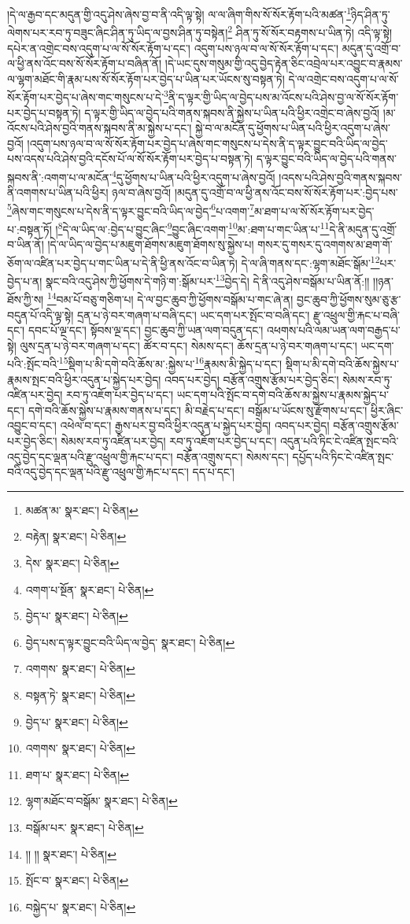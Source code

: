 །དེ་ལ་རྒྱབ་དང་མདུན་གྱི་འདུ་ཤེས་ཞེས་བྱ་བ་ནི་འདི་ལྟ་སྟེ། ལ་ལ་ཞིག་གིས་སོ་སོར་རྟོག་པའི་མཚན་\footnote{མཚན་མ་  སྣར་ཐང་།  པེ་ཅིན། }ཉིད་ཤིན་ཏུ་ལེགས་པར་རབ་ཏུ་བཟུང་ཞིང་ཤིན་ཏུ་ཡིད་ལ་བྱས་ཤིན་ཏུ་བསྟེན།\footnote{བརྟེན།  སྣར་ཐང་།  པེ་ཅིན། } ཤིན་ཏུ་སོ་སོར་བརྟགས་པ་ཡིན་ཏེ། འདི་ལྟ་སྟེ། དཔེར་ན་འགྲེང་བས་འདུག་པ་ལ་སོ་སོར་རྟོག་པ་དང་། འདུག་པས་ཉལ་བ་ལ་སོ་སོར་རྟོག་པ་དང་། མདུན་དུ་འགྲོ་བ་ལ་ཕྱི་ནས་འོང་བས་སོ་སོར་རྟོག་པ་བཞིན་ནོ། །དེ་ཡང་དུས་གསུམ་གྱི་འདུ་བྱེད་རྟེན་ཅིང་འབྲེལ་པར་འབྱུང་བ་རྣམས་ལ་ལྷག་མཐོང་གི་རྣམ་པས་སོ་སོར་རྟོག་པར་བྱེད་པ་ཡིན་པར་ཡོངས་སུ་བསྟན་ཏེ། དེ་ལ་འགྲེང་བས་འདུག་པ་ལ་སོ་སོར་རྟོག་པར་བྱེད་པ་ཞེས་གང་གསུངས་པ་དེ་\footnote{དེས་  སྣར་ཐང་།  པེ་ཅིན། }ནི་ད་ལྟར་གྱི་ཡིད་ལ་བྱེད་པས་མ་འོངས་པའི་ཤེས་བྱ་ལ་སོ་སོར་རྟོག་པར་བྱེད་པ་བསྟན་ཏེ། ད་ལྟར་གྱི་ཡིད་ལ་བྱེད་པའི་གནས་སྐབས་ནི་སྐྱེས་པ་ཡིན་པའི་ཕྱིར་འགྲེང་བ་ཞེས་བྱའོ། །མ་འོངས་པའི་ཤེས་བྱའི་གནས་སྐབས་ནི་མ་སྐྱེས་པ་དང་། སྐྱེ་བ་ལ་མངོན་དུ་ཕྱོགས་པ་ཡིན་པའི་ཕྱིར་འདུག་པ་ཞེས་བྱའོ། །འདུག་པས་ཉལ་བ་ལ་སོ་སོར་རྟོག་པར་བྱེད་པ་ཞེས་གང་གསུངས་པ་དེས་ནི་ད་ལྟར་བྱུང་བའི་ཡིད་ལ་བྱེད་པས་འདས་པའི་ཤེས་བྱའི་དངོས་པོ་ལ་སོ་སོར་རྟོག་པར་བྱེད་པ་བསྟན་ཏེ། ད་ལྟར་བྱུང་བའི་ཡིད་ལ་བྱེད་པའི་གནས་སྐབས་ནི་:འགག་པ་ལ་མངོན་\footnote{འགག་པ་སྔོན་  སྣར་ཐང་།  པེ་ཅིན། }དུ་ཕྱོགས་པ་ཡིན་པའི་ཕྱིར་འདུག་པ་ཞེས་བྱའོ། །འདས་པའི་ཤེས་བྱའི་གནས་སྐབས་ནི་འགགས་པ་ཡིན་པའི་ཕྱིར། ཉལ་བ་ཞེས་བྱའོ། །མདུན་དུ་འགྲོ་བ་ལ་ཕྱི་ནས་འོང་བས་སོ་སོར་རྟོག་པར་:བྱེད་པས་\footnote{བྱེད་པ་  སྣར་ཐང་།  པེ་ཅིན། }ཞེས་གང་གསུངས་པ་དེས་ནི་ད་ལྟར་བྱུང་བའི་ཡིད་ལ་བྱེད་\footnote{བྱེད་པས་ད་ལྟར་བྱུང་བའི་ཡིད་ལ་བྱེད་  སྣར་ཐང་།  པེ་ཅིན། }པ་འགག་\footnote{འགགས་  སྣར་ཐང་།  པེ་ཅིན། }མ་ཐག་པ་ལ་སོ་སོར་རྟོག་པར་བྱེད་པ་:བསྟན་ཏོ། །\footnote{བསྟན་ཏེ་  སྣར་ཐང་།  པེ་ཅིན། }དེ་ལ་ཡིད་ལ་:བྱེད་པ་བྱུང་ཞིང་\footnote{བྱེད་པ་  སྣར་ཐང་།  པེ་ཅིན། }བྱུང་ཞིང་འགག་\footnote{འགགས་  སྣར་ཐང་།  པེ་ཅིན། }མ་:ཐག་པ་གང་ཡིན་པ་\footnote{ཐག་པ་  སྣར་ཐང་།  པེ་ཅིན། }དེ་ནི་མདུན་དུ་འགྲོ་བ་ཡིན་ནོ། །དེ་ལ་ཡིད་ལ་བྱེད་པ་མཇུག་ཐོགས་མཇུག་ཐོགས་སུ་སྐྱེས་པ། གསར་དུ་གསར་དུ་འགགས་མ་ཐག་གོ་ཅོག་ལ་འཛིན་པར་བྱེད་པ་གང་ཡིན་པ་དེ་ནི་ཕྱི་ནས་འོང་བ་ཡིན་ཏེ། དེ་ལ་ཞི་གནས་དང་:ལྷག་མཐོང་སྒོམ་\footnote{ལྷག་མཐོང་བ་བསྒོམ་  སྣར་ཐང་།  པེ་ཅིན། }པར་བྱེད་པ་ན། སྣང་བའི་འདུ་ཤེས་ཀྱི་ཕྱོགས་དེ་གཉི་ག་:སྒོམ་པར་\footnote{བསྒོམ་པར་  སྣར་ཐང་།  པེ་ཅིན། }བྱེད་དེ། དེ་ནི་འདུ་ཤེས་བསྒོམ་པ་ཡིན་ནོ:།། །།ཉན་ཐོས་ཀྱི་ས། \footnote{།། །།   སྣར་ཐང་།  པེ་ཅིན། }བམ་པོ་བཅུ་གཅིག་པ། དེ་ལ་བྱང་ཆུབ་ཀྱི་ཕྱོགས་བསྒོམ་པ་གང་ཞེ་ན། བྱང་ཆུབ་ཀྱི་ཕྱོགས་སུམ་ཅུ་རྩ་བདུན་པོ་འདི་ལྟ་སྟེ། དྲན་པ་ཉེ་བར་གཞག་པ་བཞི་དང་། ཡང་དག་པར་སྤོང་བ་བཞི་དང་། རྫུ་འཕྲུལ་གྱི་རྐང་པ་བཞི་དང་། དབང་པོ་ལྔ་དང་། སྟོབས་ལྔ་དང་། བྱང་ཆུབ་ཀྱི་ཡན་ལག་བདུན་དང་། འཕགས་པའི་ལམ་ཡན་ལག་བརྒྱད་པ་སྟེ། ལུས་དྲན་པ་ཉེ་བར་གཞག་པ་དང་། ཚོར་བ་དང་། སེམས་དང་། ཆོས་དྲན་པ་ཉེ་བར་གཞག་པ་དང་། ཡང་དག་པའི་:སྤོང་བའི་\footnote{སྤོང་བ་  སྣར་ཐང་།  པེ་ཅིན། }སྡིག་པ་མི་དགེ་བའི་ཆོས་མ་:སྐྱེས་པ་\footnote{བསྐྱེད་པ་  སྣར་ཐང་།  པེ་ཅིན། }རྣམས་མི་སྐྱེད་པ་དང་། སྡིག་པ་མི་དགེ་བའི་ཆོས་སྐྱེས་པ་རྣམས་སྤང་བའི་ཕྱིར་འདུན་པ་སྐྱེད་པར་བྱེད། འབད་པར་བྱེད། བརྩོན་འགྲུས་རྩོམ་པར་བྱེད་ཅིང་། སེམས་རབ་ཏུ་འཛིན་པར་བྱེད། རབ་ཏུ་འཇོག་པར་བྱེད་པ་དང་། ཡང་དག་པའི་སྤོང་བ་དགེ་བའི་ཆོས་མ་སྐྱེས་པ་རྣམས་སྐྱེད་པ་དང་། དགེ་བའི་ཆོས་སྐྱེས་པ་རྣམས་གནས་པ་དང་། མི་བརྗེད་པ་དང་། བསྒོམ་པ་ཡོངས་སུ་རྫོགས་པ་དང་། ཕྱིར་ཞིང་འབྱུང་བ་དང་། འཕེལ་བ་དང་། རྒྱས་པར་བྱ་བའི་ཕྱིར་འདུན་པ་སྐྱེད་པར་བྱེད། འབད་པར་བྱེད། བརྩོན་འགྲུས་རྩོམ་པར་བྱེད་ཅིང་། སེམས་རབ་ཏུ་འཛིན་པར་བྱེད། རབ་ཏུ་འཇོག་པར་བྱེད་པ་དང་། འདུན་པའི་ཏིང་ངེ་འཛིན་སྤང་བའི་འདུ་བྱེད་དང་ལྡན་པའི་རྫུ་འཕྲུལ་གྱི་རྐང་པ་དང་། བརྩོན་འགྲུས་དང་། སེམས་དང་། དཔྱོད་པའི་ཏིང་ངེ་འཛིན་སྤང་བའི་འདུ་བྱེད་དང་ལྡན་པའི་རྫུ་འཕྲུལ་གྱི་རྐང་པ་དང་། དད་པ་དང་། 